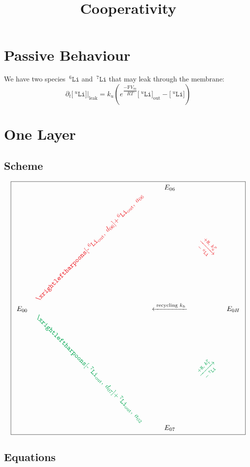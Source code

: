 \documentclass[aps,onecolumn,11pt]{revtex4}
\newcommand{\mychem}[1]{\mathtt{#1}}
\newcommand{\myconc}[1]{\big[#1\big]}
\newcommand{\Faraday}{\mathrm{F}}
\newcommand{\spLi}[1]{{\!~^{#1}\mychem{Li}}}
\newcommand{\Li}[1]{\myconc{\spLi{#1}}}
\newcommand{\spproton}{\mychem{H}}
\newcommand{\myleak}[1]{\left.{#1}\right\vert_{\mathrm{leak}}}
\newcommand{\myout}[1]{{#1}_{\mathrm{out}}}
\newcommand{\LiOut}[1]{\myout{\Li{#1}}}
\newcommand{\spLiOut}[1]{\myout{\spLi{#1}}}
\newcommand{\myrotate}[2]{\rotatebox[origin=c]{#1}{#2}}
\newcommand{\outLi}[1]{\text{-}\spLiOut{#1}}
\newcommand{\mycolor}[2]{\ifthenelse{\equal{#1}{6}}{{\color{Red}#2}}{{\color{Green}#2}}}
\begin{document}
\title{Cooperativity}
\maketitle

\section{Passive Behaviour}
We have two species $\spLi{6}$ and $\spLi{7}$ that may leak through the membrane:
\begin{equation}
	\partial_t \myleak{\Li{u}} = k_u \left( e^{\dfrac{-\Faraday V_m }{RT}} \LiOut{u} - \Li{u}\right)
\end{equation}

\section{One Layer}

\subsection{Scheme}
{
\Large
\begin{equation}
\boxed{
\begin{array}{ccccc}
 & & E_{06}  &  & \\
 &  \mycolor{6}{\myrotate{45}{$\xrightleftharpoons[\outLi{6},\;d_{06}]{+\spLiOut{6},\;a_{06}}$}} &   & \mycolor{6}{\myrotate{-45}{$\xrightarrow[-\spLi{6}]{+ \spproton, \; k^p_6}$}} &  \\
E_{00}  &  & \xleftarrow{\text{ recycling } k_h } &   & E_{0H} \\
  & \mycolor{7}{\myrotate{-45}{$\xrightleftharpoons[\outLi{7},\;d_{07}]{+\spLiOut{7},\;a_{02}}$}} &   & \mycolor{7}{\myrotate{+45}{$\xrightarrow[-\spLi{7}]{+ \spproton, \; k^p_7}$}} & \\
 & & E_{07} & & \\
 \end{array}
 }
\end{equation}
}

\subsection{Equations}
\end{document}
